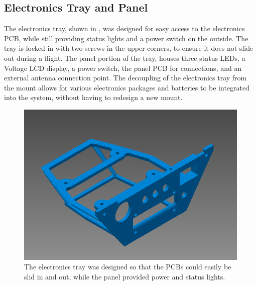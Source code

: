 	\subsection{Electronics Tray and Panel}
	The electronics tray, shown in , was designed for easy access to the electronics PCB, while still providing status lights and a power switch on the outside.  The tray is locked in with two screws in the upper corners, to ensure it does not slide out during a flight.  The panel portion of the tray, houses three status LEDs, a Voltage LCD display, a power switch, the panel PCB for connections, and an external antenna connection point.  The decoupling of the electronics tray from the mount allows for various electronics packages and batteries to be integrated into the system, without having to redesign a new mount.
	\begin{figure}[H]
		\centering
		\includegraphics[scale = 0.4]{../figures/cad/electronicsTray.png}
		\caption{The electronics tray was designed so that the PCBs could easily be slid in and out, while the panel provided power and status lights.}
		\label{fig:elec}
	\end{figure}
		
